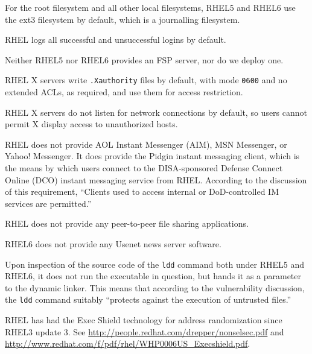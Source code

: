  For the root filesystem and all
other local filesystems, RHEL5 and RHEL6 use the ext3 filesystem by
default, which is a journalling filesystem.

 RHEL logs all successful and
unsuccessful logins by default.

 Neither RHEL5 nor RHEL6 provides
an FSP server, nor do we deploy one.

RHEL X servers write \verb!.Xauthority! files by default, with mode
\verb!0600! and no extended ACLs, as required, and use them for access
restriction.

 RHEL X servers do not listen for
network connections by default, so users cannot permit X display access to
unauthorized hosts.

 RHEL does not provide AOL
Instant Messenger (AIM), MSN Messenger, or Yahoo! Messenger. It does
provide the Pidgin instant messaging client, which is the means by which
users connect to the DISA-sponsored Defense Connect Online (DCO) instant
messaging service from RHEL. According to the discussion of this
requirement, ``Clients used to access internal or DoD-controlled IM
services are permitted.''

 RHEL does not provide any
peer-to-peer file sharing applications.

 RHEL6 does not provide any Usenet news
server software.

 Upon inspection of the source
code of the \verb!ldd! command both under RHEL5 and RHEL6, it does not run
the executable in question, but hands it as a parameter to the dynamic
linker. This means that according to the vulnerability discussion, the
\verb!ldd! command suitably ``protects against the execution of untrusted
files.''

 RHEL has had the Exec Shield
technology for address randomization since RHEL3 update 3. See
\url{http://people.redhat.com/drepper/nonselsec.pdf} and
\url{http://www.redhat.com/f/pdf/rhel/WHP0006US_Execshield.pdf}.

